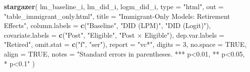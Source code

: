 \documentclass[
]{article}
\newenvironment{Shaded}{\begin{snugshade}}{\end{snugshade}}
\newcommand{\AttributeTok}[1]{\textcolor[rgb]{0.13,0.29,0.53}{#1}}
\newcommand{\ConstantTok}[1]{\textcolor[rgb]{0.56,0.35,0.01}{#1}}
\newcommand{\DecValTok}[1]{\textcolor[rgb]{0.00,0.00,0.81}{#1}}
\newcommand{\FunctionTok}[1]{\textcolor[rgb]{0.13,0.29,0.53}{\textbf{#1}}}
\newcommand{\NormalTok}[1]{#1}
\newcommand{\StringTok}[1]{\textcolor[rgb]{0.31,0.60,0.02}{#1}}
\begin{document}
\begin{Shaded}
\begin{Highlighting}[]
\FunctionTok{stargazer}\NormalTok{(}
\NormalTok{  lm\_baseline\_i, lm\_did\_i, logm\_did\_i,}
  \AttributeTok{type =} \StringTok{"html"}\NormalTok{,}
  \AttributeTok{out =} \StringTok{"table\_immigrant\_only.html"}\NormalTok{,}
  \AttributeTok{title =} \StringTok{"Immigrant{-}Only Models: Retirement Effects"}\NormalTok{,}
  \AttributeTok{column.labels =} \FunctionTok{c}\NormalTok{(}\StringTok{"Baseline"}\NormalTok{, }\StringTok{"DID (LPM)"}\NormalTok{, }\StringTok{"DID (Logit)"}\NormalTok{),}
  \AttributeTok{covariate.labels =} \FunctionTok{c}\NormalTok{(}\StringTok{"Post"}\NormalTok{, }\StringTok{"Eligible"}\NormalTok{, }\StringTok{"Post × Eligible"}\NormalTok{),}
  \AttributeTok{dep.var.labels =} \StringTok{"Retired"}\NormalTok{,}
  \AttributeTok{omit.stat =} \FunctionTok{c}\NormalTok{(}\StringTok{"f"}\NormalTok{, }\StringTok{"ser"}\NormalTok{),}
  \AttributeTok{report =} \StringTok{"vc*"}\NormalTok{,}
  \AttributeTok{digits =} \DecValTok{3}\NormalTok{,}
  \AttributeTok{no.space =} \ConstantTok{TRUE}\NormalTok{,}
  \AttributeTok{align =} \ConstantTok{TRUE}\NormalTok{,}
  \AttributeTok{notes =} \StringTok{"Standard errors in parentheses. *** p\textless{}0.01, ** p\textless{}0.05, * p\textless{}0.1"}
\NormalTok{)}
\end{Highlighting}
\end{Shaded}
\end{document}

